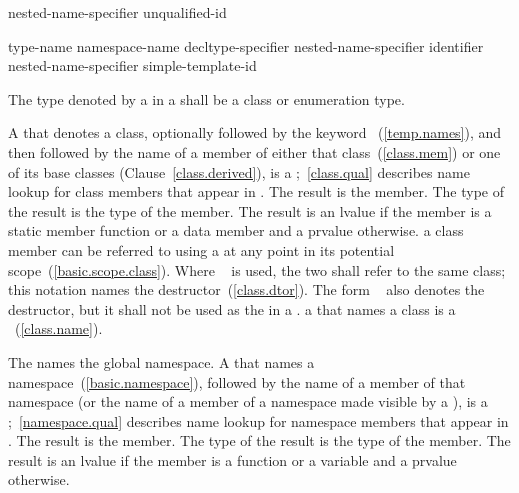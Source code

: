 %
%
%
\begin{bnf}
\br
    nested-name-specifier \opt unqualified-id
\end{bnf}

%
%
%
\begin{bnf}
\br
    \terminal{::}\br
    type-name \terminal{::}\br
    namespace-name \terminal{::}\br
    decltype-specifier \terminal{::}\br
    nested-name-specifier identifier \terminal{::}\br
    nested-name-specifier \opt simple-template-id \terminal{::}
\end{bnf}

The type denoted by a  in a
 shall be a class or enumeration
type.

\pnum
A  that denotes a class, optionally
followed by the keyword ~(\ref{temp.names}), and then
followed by the name of a member of either that class~(\ref{class.mem})
or one of its base classes (Clause~\ref{class.derived}), is a
%
;~\ref{class.qual} describes name lookup for
class members that appear in . The result is the
member. The type of the result is the type of the member. The result is
an lvalue if the member is a static member function or a data member and a
prvalue otherwise.
\enternote 
a class member can be referred to using a  at any
point in its potential scope~(\ref{basic.scope.class}).
\exitnote 
Where
 \tcode{::\tilde}~ is used,
the two  shall refer to the same class; this
notation names the destructor~(\ref{class.dtor}).
The form \tcode{\tilde}~ also denotes the destructor,
but it shall not be used as the  in a .
\enternote 
a  that names a class is a
~(\ref{class.name}).
\exitnote 

\pnum
The  \tcode{::} names the global namespace.
A  that names a
namespace~(\ref{basic.namespace}), followed by the name of a member of
that namespace (or the name of a member of a namespace made visible by a
), is a
%
;~\ref{namespace.qual} describes name lookup for
namespace members that appear in . The result is
the member. The type of the result is the type of the member. The result
is an lvalue if the member is a function or a variable and a prvalue otherwise.

